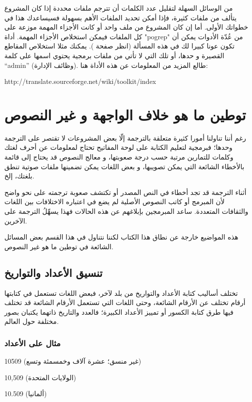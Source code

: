 من الوسائل السهلة لتقليل عدد الكلمات أن تترجم ملفات محددة إذا كان
المشروع يتألف من ملفات كثيرة، فإذا أمكن تحديد الملفات الأهم بسهولة
فسيساعدك هذا في خطواتك الأولى. أما إن كان المشروع من ملف واحد أو كانت
الأجزاء المهمة موزعة على كل الملفات فيمكن استخلاص الأجزاء المهمة. أداة
"pogrep" من عُدّة الأدوات يمكن أن تكون عونا كبيرا لك في هذه المسألة
(انظر صفحة \at[ref:20165030]). يمكنك مثلا استخلاص المقاطع
القصيرة و حدها، أو تلك التي لا تأتي من ملفات برمجية يحتوي اسمها على
كلمة “admin” (وظائف الإدارة). طالع المزيد من المعلومات عن هذه الأداة
هنا:

http://translate.sourceforge.net/wiki/toolkit/index

\section{توطين ما هو خلاف الواجهة و غير النصوص}
رغم أننا تناولنا أمورا كثيرة متعلقة بالترجمة إلّا بعض المشروعات لا تقتصر
على الترجمة وحدها؛ فبرمجية لتعليم الكتابة على لوحة المفاتيح تحتاج
لمعلومات عن أحرف لغتك وكلمات للتمارين مرتبة حسب درجة صعوبتها، و معالج
النصوص قد يحتاج إلى قائمة بالأخطاء الشائعة التي يمكن تصويبها، و بعض
اللغات يمكن تضمينها ملفات صوتية تنطق بلغتك، إلخ.

أثناء الترجمة قد تجد أخطاء في النص المصدر أو تكتشف صعوبة ترجمته على نحو
واضح لأن المبرمج أو كاتب النصوص الأصلية لم يضع في اعتباره الاختلافات
بين اللغات والثقافات المتعددة. ساعد المبرمجين بإبلاغهم عن هذه الحالات
فهذا يسهِّلُ الترجمة على الآخرين.

هذه المواضيع خارجة عن نطاق هذا الكتاب لكننا نتناول في هذا القسم بعض
المسائل الشائعة في توطين ما هو غير النصوص.

\subsection[ref:30596701]{تنسيق الأعداد والتواريخ}
تختلف أساليب كتابة الأعداد
والتواريخ من بلد لآخر، فبعض اللغات تستعمل في كتابتها أرقام تختلف عن
الأرقام الشائعة، وحتى اللغات التي تستعمل الأرقام الشائعة قد تختلف فيها
طرق كتابة الكسور أو تمييز الأعداد الكبيرة؛ فالعدد والتاريخ ذاتهما
يكتبان بصور مختلفة حول العالم.

\subsubsection{مثال على الأعداد}
10509 (غير منسق؛ عشرة آلاف وخمسمئة وتسع)

10,509 (الولايات المتحدة)

10.509 (ألمانيا)

